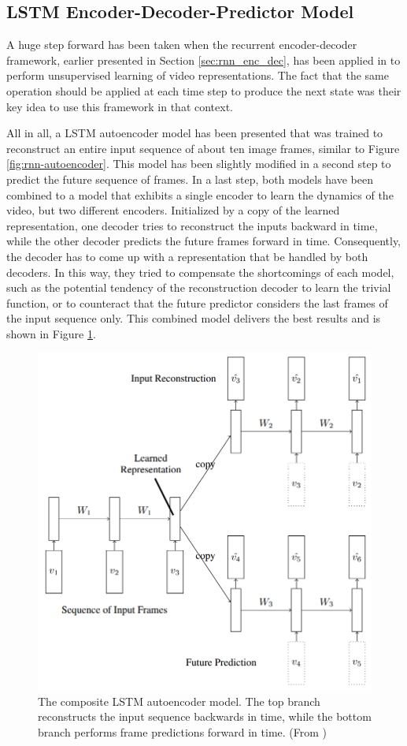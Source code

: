 \subsection{LSTM Encoder-Decoder-Predictor Model}

A huge step forward has been taken when the recurrent encoder-decoder framework, earlier presented in Section \ref{sec:rnn_enc_dec}, has been applied in \parencite{unsup_learn_lstm} to perform unsupervised learning of video representations. The fact that the same operation should be applied at each time step to produce the next state was their key idea to use this framework in that context. 

All in all, a LSTM autoencoder model has been presented that was trained to reconstruct an entire input sequence of about ten image frames, similar to Figure \ref{fig:rnn-autoencoder}. This model has been slightly modified in a second step to predict the future sequence of frames. In a last step, both models have been combined to a model that exhibits a single encoder to learn the dynamics of the video, but two different encoders. Initialized by a copy of the learned representation, one decoder tries to reconstruct the inputs backward in time, while the other decoder predicts the future frames forward in time. Consequently, the decoder has to come up with a representation that be handled by both decoders. In this way, they tried to compensate the shortcomings of each model, such as the potential tendency of the reconstruction decoder to learn the trivial function, or to counteract that the future predictor considers the last frames of the input sequence only. This combined model delivers the best results and is shown in Figure \ref{fig:lstm_combo}.

\begin{figure}[htb]
	\centering
	\includegraphics[width=0.5\linewidth]{figures/related/combo_shrinked.png} 
	\caption[Composite LSTM Autoencoder Model]{The composite LSTM autoencoder model. The top branch reconstructs the input sequence backwards in time, while the bottom branch performs frame predictions forward in time. (From \parencite{unsup_learn_lstm})} \label{fig:lstm_combo}
\end{figure}

